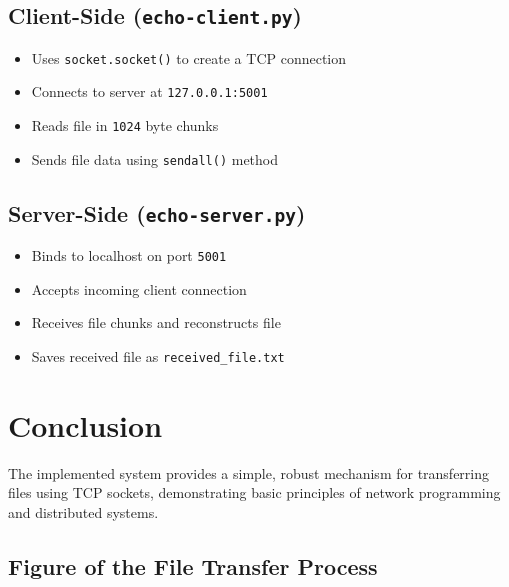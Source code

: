 \documentclass{article}
\begin{document}
\subsection{Client-Side (\texttt{echo-client.py})}
\begin{itemize}
    \item Uses \texttt{socket.socket()} to create a TCP connection
    \item Connects to server at \texttt{127.0.0.1:5001}
    \item Reads file in \texttt{1024} byte chunks
    \item Sends file data using \texttt{sendall()} method
\end{itemize}

\subsection{Server-Side (\texttt{echo-server.py})}
\begin{itemize}
    \item Binds to localhost on port \texttt{5001}
    \item Accepts incoming client connection
    \item Receives file chunks and reconstructs file
    \item Saves received file as \texttt{received\_file.txt}
\end{itemize}

\section{Conclusion}
The implemented system provides a simple, robust mechanism for transferring files using TCP sockets, demonstrating basic principles of network programming and distributed systems.


\subsection*{Figure of the File Transfer Process}
\end{document}
